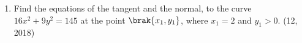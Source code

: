 \begin{enumerate}[label=\thesubsection.\arabic*,ref=\thesubsection.\theenumi]
\item Find the equations of the tangent and the normal, to the curve $16x^{2}+9y^{2}=145$ at the point $\brak{x_1,y_1}$, where $x_1=2$ and $y_1>0$. \hfill (12, 2018)
\end{enumerate}
